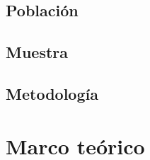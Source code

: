 \documentclass{report}
\begin{document}
\subsection{Población}


\subsection{Muestra}


\subsection{Metodología}


\section{Marco teórico}



\printbibliography
\end{document}
